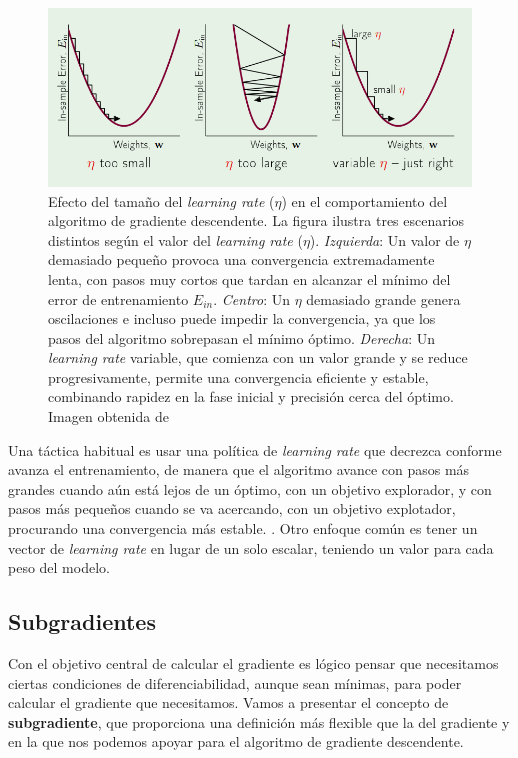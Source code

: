 \begin{figure}
    \centering
    \includegraphics[width=0.75\linewidth]{Plantilla_TFG_latex//imagenes//Mat//GD/lr.png}
    \caption[Efecto del tamaño del \textit{learning rate} en el comportamiento del algoritmo de gradiente descendente]{Efecto del tamaño del \textit{learning rate} ($\eta$) en el comportamiento del algoritmo de gradiente descendente. La figura ilustra tres escenarios distintos según el valor del \textit{learning rate} ($\eta$). \textit{Izquierda}: Un valor de $\eta$ demasiado pequeño provoca una convergencia extremadamente lenta, con pasos muy cortos que tardan en alcanzar el mínimo del error de entrenamiento $E_{in}$. \textit{Centro}: Un $\eta$ demasiado grande genera oscilaciones e incluso puede impedir la convergencia, ya que los pasos del algoritmo sobrepasan el mínimo óptimo. \textit{Derecha}: Un \textit{learning rate} variable, que comienza con un valor grande y se reduce progresivamente, permite una convergencia eficiente y estable, combinando rapidez en la fase inicial y precisión cerca del óptimo. Imagen obtenida de \cite{Mostafa2012}}
    \label{fig:lr}
\end{figure}

Una táctica habitual es usar una política de \textit{learning rate} que decrezca conforme avanza el entrenamiento, de manera que el algoritmo avance con pasos más grandes cuando aún está lejos de un óptimo, con un objetivo explorador, y con pasos más pequeños cuando se va acercando, con un objetivo explotador, procurando una convergencia más estable. \cite{GoodFellowBook}. Otro enfoque común es tener un vector de \textit{learning rate} en lugar de un solo escalar, teniendo un valor para cada peso del modelo. 





\subsection{Subgradientes} \label{sec:subgrad}

Con el objetivo central de calcular el gradiente es lógico pensar que necesitamos ciertas condiciones de diferenciabilidad, aunque sean mínimas, para poder calcular el gradiente que necesitamos. Vamos a presentar el concepto de \textbf{subgradiente}, que proporciona una definición más flexible que la del gradiente y en la que nos podemos apoyar para el algoritmo de gradiente descendente.

